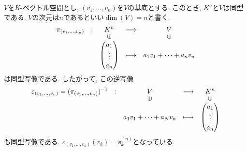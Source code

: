\begin{remark}
  $V$を$K$-ベクトル空間とし,
  $(v_1,\ldots,v_n)$を$V$の基底とする.
  このとき, $K^n$と$V$は同型である.
  $V$の次元は$n$であるといい$\dim(V)=n$と書く.
  \begin{align*}
    \shazo{\pi_{(v_1,\ldots,v_n)}}
          {K^n}{V}
          {\begin{pmatrix}a_1\\\vdots\\a_n\end{pmatrix}}{a_1v_1+\cdots+a_n v_n}
  \end{align*}
  は同型写像である. したがって, この逆写像
  \begin{align*}
    \shazo{\varepsilon_{(v_1,\ldots,v_n)}=(\pi_{(v_1,\ldots,v_n)})^{-1}}
          {V}{K^n}
          {a_1v_1+\cdots+a_Nv_n}{\begin{pmatrix}a_1\\\vdots\\a_n\end{pmatrix}}
  \end{align*}
  も同型写像である.
  $\varepsilon_{(v_1,\ldots,v_n)}(v_k)=\ee_k^{(n)}$となっている.
\end{remark}

